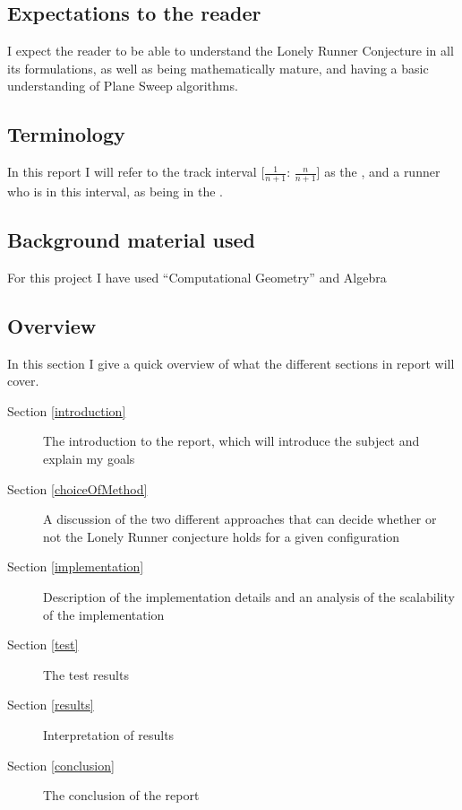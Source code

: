 \subsection{Expectations to the reader}
\label{expectations}
I expect the reader to be able to understand the Lonely Runner Conjecture in all its formulations, as well as being mathematically mature, and having a basic understanding of Plane Sweep algorithms.

\subsection{Terminology}
\label{Termonolgy}
In this report I will refer to the track interval [$\frac{1}{n + 1}$: $\frac{n}{n+1}$] as the \zone, and a runner who is in this interval, as being in the \zone.

\subsection{Background material used}
\label{background}
For this project I have used ``Computational Geometry'' \cite{citeulike:3347056} and Algebra  

\subsection{Overview}

In this section I give a quick overview of what the different sections in report will cover.
\begin{description}
\item[Section \ref{introduction}] The introduction to the report, which will introduce the subject and explain my goals
\item[Section \ref{choiceOfMethod}] A discussion of the two different approaches that can decide whether or not the Lonely Runner conjecture holds for a given configuration
\item[Section \ref{implementation}] Description of the implementation details and an analysis of the scalability of the implementation
\item[Section \ref{test}] The test results
\item[Section \ref{results}] Interpretation of results
\item[Section \ref{conclusion}] The conclusion of the report  
\end{description}

